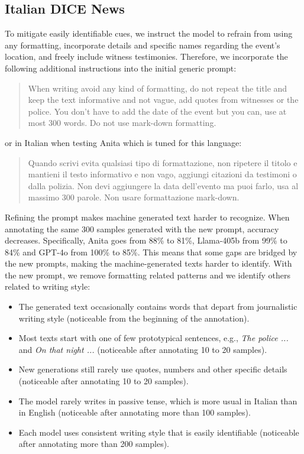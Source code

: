 \subsection{Italian DICE News}
To mitigate easily identifiable cues, we instruct the model to refrain from using any formatting, incorporate details and specific names regarding the event's location, and freely include witness testimonies. Therefore, we incorporate the following additional instructions into the initial generic prompt: 
\begin{quote}
When writing avoid any kind of formatting, do not repeat the title and keep the text informative and not vague, add quotes from witnesses or the police. You don't have to add the date of the event but you can, use at most 300 words. Do not use mark-down formatting.
\end{quote}
or in Italian when testing Anita which is tuned for this language:
\begin{quote}
Quando scrivi evita qualsiasi tipo di formattazione, non ripetere il titolo e mantieni il testo informativo e non vago, aggiungi citazioni da testimoni o dalla polizia. Non devi aggiungere la data dell'evento ma puoi farlo, usa al massimo 300 parole. Non usare formattazione mark-down.
\end{quote}

Refining the prompt makes machine generated text harder to recognize. When annotating the same 300 samples generated with the new prompt, accuracy decreases. Specifically, Anita goes from 88\% to 81\%, Llama-405b from 99\% to 84\% and GPT-4o from 100\% to 85\%. This means that some gaps are bridged by the new prompts, making the machine-generated texts harder to identify. 
With the new prompt, we remove formatting related patterns and we identify others related to writing style:
\begin{itemize}
    \item The generated text occasionally contains words that depart from journalistic writing style (noticeable from the beginning of the annotation).
    \item Most texts start with one of few prototypical sentences, e.g., \textit{The police ...} and \textit{On that night ...} (noticeable after annotating 10 to 20 samples).
    \item New generations still rarely use quotes, numbers and other specific details (noticeable after annotating 10 to 20 samples).
    \item The model rarely writes in passive tense, which is more usual in Italian than in English (noticeable after annotating more than 100 samples).
    \item Each model uses consistent writing style that is easily identifiable (noticeable after annotating more than 200 samples).
\end{itemize}

